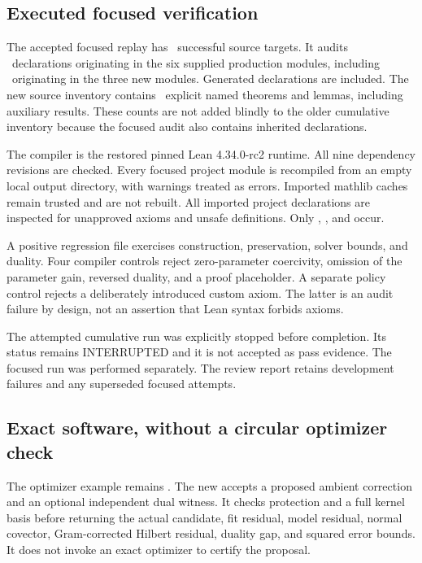\documentclass[11pt]{article}
\begin{document}
\subsection{Executed focused verification}
The accepted focused replay has \EditionFocusedTargets\ successful source targets. It audits \EditionFocusedDeclarations\ declarations originating in the six supplied production modules, including \EditionFocusedNewDeclarations\ originating in the three new modules. Generated declarations are included. The new source inventory contains \EditionFocusedTheorems\ explicit named theorems and lemmas, including auxiliary results. These counts are not added blindly to the older cumulative inventory because the focused audit also contains inherited declarations.

The compiler is the restored pinned Lean 4.34.0-rc2 runtime. All nine dependency revisions are checked. Every focused project module is recompiled from an empty local output directory, with warnings treated as errors. Imported mathlib caches remain trusted and are not rebuilt. All imported project declarations are inspected for unapproved axioms and unsafe definitions. Only , , and  occur.

A positive regression file exercises construction, preservation, solver bounds, and duality. Four compiler controls reject zero-parameter coercivity, omission of the parameter gain, reversed duality, and a proof placeholder. A separate policy control rejects a deliberately introduced custom axiom. The latter is an audit failure by design, not an assertion that Lean syntax forbids axioms.

The attempted cumulative run  was explicitly stopped before completion. Its status remains INTERRUPTED and it is not accepted as pass evidence. The focused run was performed separately. The review report retains development failures and any superseded focused attempts.

\subsection{Exact software, without a circular optimizer check}
The optimizer example remains . The new  accepts a proposed ambient correction and an optional independent dual witness. It checks protection and a full kernel basis before returning the actual candidate, fit residual, model residual, normal covector, Gram-corrected Hilbert residual, duality gap, and squared error bounds. It does not invoke an exact optimizer to certify the proposal.
\end{document}
